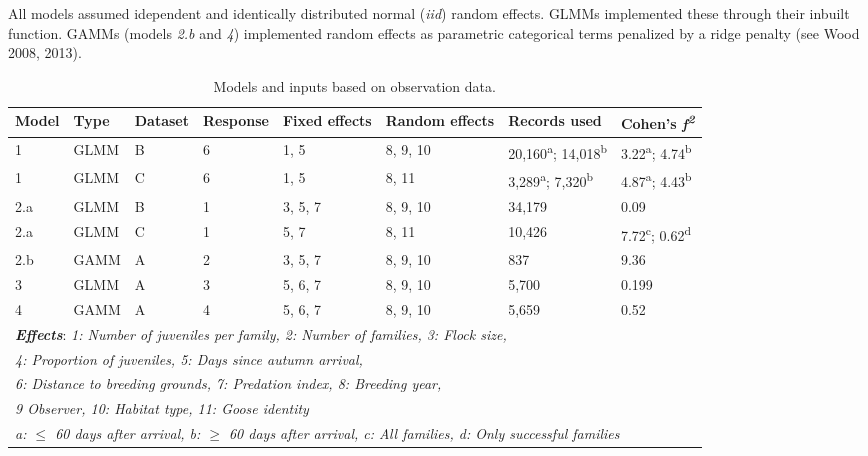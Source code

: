 \documentclass[10pt,twocolumn]{paper}
\begin{document}
All models assumed idependent and identically distributed normal
(\emph{iid}) random effects. GLMMs implemented these through their
inbuilt function. GAMMs (models \emph{2.b} and \emph{4}) implemented
random effects as parametric categorical terms penalized by a ridge
penalty (see Wood 2008, 2013).

\begin{table}[H]
\begin{tabular}{l*7l}
\toprule
Model & Type & Dataset & Response & Fixed effects & Random effects & Records used & Cohen's \emph{f\textsuperscript{2}}\\
\midrule
1 & GLMM & B & 6 & 1, 5 & 8, 9, 10 & 20,160\textsuperscript{a}; 14,018\textsuperscript{b} & 3.22\textsuperscript{a}; 4.74\textsuperscript{b}\\

1 & GLMM & C & 6 & 1, 5 & 8, 11 & 3,289\textsuperscript{a}; 7,320\textsuperscript{b} & 4.87\textsuperscript{a}; 4.43\textsuperscript{b}\\

2.a & GLMM & B & 1 & 3, 5, 7 & 8, 9, 10 & 34,179 & 0.09\\

2.a & GLMM & C & 1 & 5, 7 & 8, 11 & 10,426 & 7.72\textsuperscript{c}; 0.62\textsuperscript{d} \\

2.b & GAMM & A & 2 & 3, 5, 7 & 8, 9, 10 & 837 & 9.36\\

3 & GLMM & A & 3 & 5, 6, 7 & 8, 9, 10 & 5,700 & 0.199\\

4 & GAMM & A & 4 & 5, 6, 7 & 8, 9, 10 & 5,659 & 0.52\\\midrule

\multicolumn{8}{l}{\textbf{\emph{Effects}}: \emph{1: Number of juveniles per family, 2: Number of families, 3: Flock size,}} \\
\multicolumn{8}{l}{\emph{4: Proportion of juveniles, 5: Days since autumn arrival,}} \\
\multicolumn{8}{l}{\emph{6: Distance to breeding grounds, 7: Predation index, 8: Breeding year,}} \\
\multicolumn{8}{l}{\emph{9 Observer, 10: Habitat type, 11: Goose identity}} \\
\midrule
\multicolumn{8}{l}{\emph{a: \ensuremath{\le} 60 days after arrival, b: \ensuremath{\ge} 60 days after arrival, c: All families, d: Only successful families}} \\
\bottomrule
\end{tabular}
\caption{Models and inputs based on observation data.}
\end{table}
\end{document}
